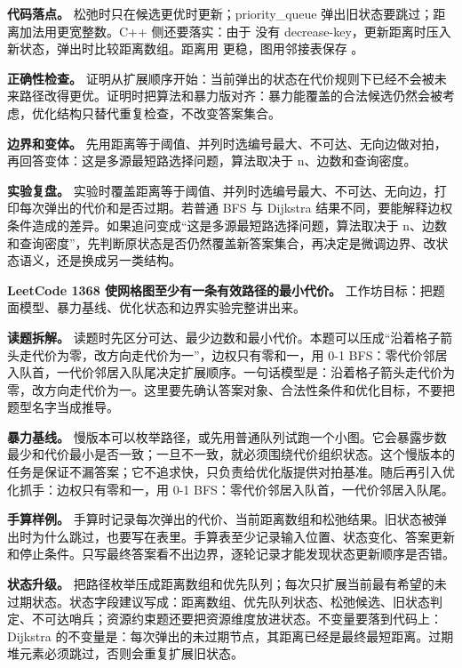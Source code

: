 \textbf{代码落点。} 松弛时只在候选更优时更新；priority\_queue 弹出旧状态要跳过；距离加法用更宽整数。C++ 侧还要落实：由于  没有 decrease-key，更新距离时压入新状态，弹出时比较距离数组。距离用  更稳，图用邻接表保存 。

\textbf{正确性检查。} 证明从扩展顺序开始：当前弹出的状态在代价规则下已经不会被未来路径改得更优。证明时把算法和暴力版对齐：暴力能覆盖的合法候选仍然会被考虑，优化结构只替代重复检查，不改变答案集合。

\textbf{边界和变体。} 先用距离等于阈值、并列时选编号最大、不可达、无向边做对拍，再回答变体：这是多源最短路选择问题，算法取决于 n、边数和查询密度。

\textbf{实验复盘。} 实验时覆盖距离等于阈值、并列时选编号最大、不可达、无向边，打印每次弹出的代价和是否过期。若普通 BFS 与 Dijkstra 结果不同，要能解释边权条件造成的差异。如果追问变成“这是多源最短路选择问题，算法取决于 n、边数和查询密度”，先判断原状态是否仍然覆盖新答案集合，再决定是微调边界、改状态语义，还是换成另一类结构。

\noindent\textbf{LeetCode 1368 使网格图至少有一条有效路径的最小代价。} 工作坊目标：把题面模型、暴力基线、优化状态和边界实验完整讲出来。

\textbf{读题拆解。} 读题时先区分可达、最少边数和最小代价。本题可以压成“沿着格子箭头走代价为零，改方向走代价为一”，边权只有零和一，用 0-1 BFS：零代价邻居入队首，一代价邻居入队尾决定扩展顺序。一句话模型是：沿着格子箭头走代价为零，改方向走代价为一。这里要先确认答案对象、合法性条件和优化目标，不要把题型名字当成推导。

\textbf{暴力基线。} 慢版本可以枚举路径，或先用普通队列试跑一个小图。它会暴露步数最少和代价最小是否一致；一旦不一致，就必须围绕代价组织状态。这个慢版本的任务是保证不漏答案；它不追求快，只负责给优化版提供对拍基准。随后再引入优化抓手：边权只有零和一，用 0-1 BFS：零代价邻居入队首，一代价邻居入队尾。

\textbf{手算样例。} 手算时记录每次弹出的代价、当前距离数组和松弛结果。旧状态被弹出时为什么跳过，也要写在表里。手算表至少记录输入位置、状态变化、答案更新和停止条件。只写最终答案看不出边界，逐轮记录才能发现状态更新顺序是否错。

\textbf{状态升级。} 把路径枚举压成距离数组和优先队列；每次只扩展当前最有希望的未过期状态。状态字段建议写成：距离数组、优先队列状态、松弛候选、旧状态判定、不可达哨兵；资源约束题还要把资源维度放进状态。不变量要落到代码上：Dijkstra 的不变量是：每次弹出的未过期节点，其距离已经是最终最短距离。过期堆元素必须跳过，否则会重复扩展旧状态。

